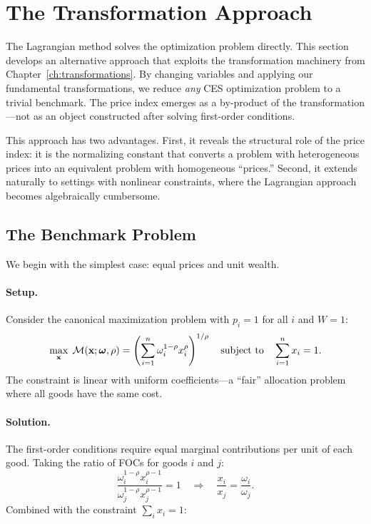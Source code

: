 \section{The Transformation Approach}
\label{sec:transformation-approach}

The Lagrangian method solves the optimization problem directly. This section develops an alternative approach that exploits the transformation machinery from Chapter~\ref{ch:transformations}. By changing variables and applying our fundamental transformations, we reduce \emph{any} CES optimization problem to a trivial benchmark. The price index emerges as a by-product of the transformation---not as an object constructed after solving first-order conditions.

This approach has two advantages. First, it reveals the structural role of the price index: it is the normalizing constant that converts a problem with heterogeneous prices into an equivalent problem with homogeneous ``prices.'' Second, it extends naturally to settings with nonlinear constraints, where the Lagrangian approach becomes algebraically cumbersome.

\subsection{The Benchmark Problem}
\label{subsec:benchmark}

We begin with the simplest case: equal prices and unit wealth.

\paragraph{Setup.}
Consider the canonical maximization problem with $p_i = 1$ for all $i$ and $W = 1$:
\begin{equation}
\label{eq:benchmark-problem}
\max_{\mathbf{x}} \; \mathcal{M}(\mathbf{x}; \boldsymbol{\omega}, \rho) = \left( \sum_{i=1}^{n} \omega_i^{1-\rho} x_i^\rho \right)^{1/\rho} \quad \text{subject to} \quad \sum_{i=1}^{n} x_i = 1.
\end{equation}
The constraint is linear with uniform coefficients---a ``fair'' allocation problem where all goods have the same cost.

\paragraph{Solution.}
The first-order conditions require equal marginal contributions per unit of each good. Taking the ratio of FOCs for goods $i$ and $j$:
\[
\frac{\omega_i^{1-\rho} x_i^{\rho-1}}{\omega_j^{1-\rho} x_j^{\rho-1}} = 1 \quad \Longrightarrow \quad \frac{x_i}{x_j} = \frac{\omega_i}{\omega_j}.
\]
Combined with the constraint $\sum_i x_i = 1$:

